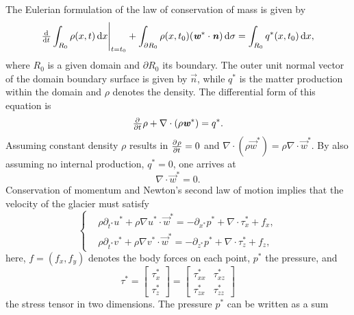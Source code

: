 The Eulerian formulation of the law of conservation of mass is given by
%
\begin{equation}
  \eval{\od{}{t} \int_{R_0} \rho(x, t) \dif{x}}_{t = t_0} + \int_{\partial R_0} \rho(x, t_0) (\vec{w}^* \cdot \vec{n}) \dif{\sigma} = \int_{R_0} q^*(x, t_0) \dif{x},
  \label{eq:conservation_of_matter_integral}
\end{equation}
%
where $R_0$ is a given domain and $\partial R_0$ its boundary. The outer unit normal vector of the domain boundary surface is given by $\vec{n}$, while $q^*$ is the matter production within the domain and $\rho$ denotes the density.
%
The differential form of this equation is
%
\begin{equation}
  \pd{}{t} \rho + \nabla \cdot (\rho \vec{w}^*) = q^*.
  \label{eq:conservation_of_matter_interior}
\end{equation}
%
Assuming constant density $\rho$ results in $\pd{\rho}{t} = 0$ and $\nabla \cdot (\rho \vec{w}^*) = \rho \nabla \cdot \vec{w}^*$. By also assuming no internal production, $q^* = 0$, one arrives at
%
\begin{equation} \label{eq:velocity-divergence}
  \nabla \cdot \vec{w}^* = 0.
\end{equation}
%
Conservation of momentum and Newton's second law of motion implies that the velocity of the glacier must satisfy
%
\begin{equation} \label{eq:momentum-conservation}
  \begin{cases}
    &\rho \partial_{t^*} u^* + \rho \nabla u^* \cdot \vec{w}^* = -\partial_{x^*} p^* + \nabla \cdot \tau_x^* + f_x, \\
    &\rho \partial_{t^*} v^* + \rho \nabla  v^* \cdot \vec{w}^* = -\partial_{z^*} p^* + \nabla \cdot \tau_z^* + f_z,
  \end{cases}
\end{equation}
%
here, $f = (f_x, f_y)$ denotes the body forces on each point, $p^*$ the pressure, and
%
\begin{equation} \label{eq:stress_tensor}
  \tau^* = \begin{bmatrix} \tau_x^* \\ \tau_z^* \end{bmatrix} = \begin{bmatrix} \tau_{xx}^* & \tau_{xz}^* \\ \tau_{zx}^* & \tau_{zz}^* \end{bmatrix}
\end{equation}
%
the stress tensor in two dimensions. The pressure $p^*$ can be written as a sum
